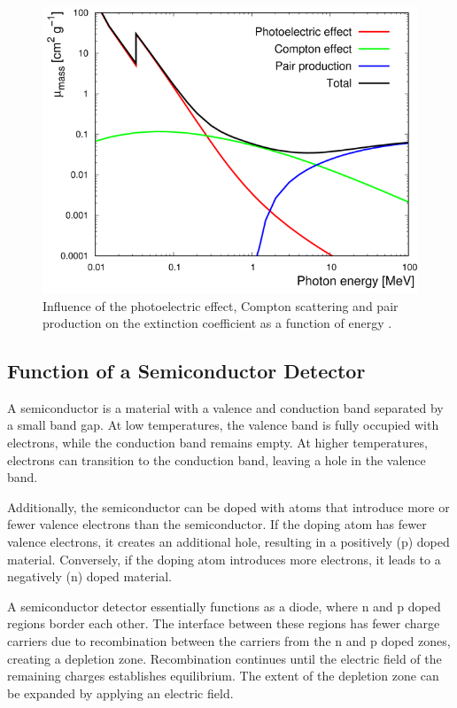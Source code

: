 \begin{figure}
    \centering
    \includegraphics[scale=0.5]{pictures/extinction.png}
    \caption{Influence of the photoelectric effect, Compton scattering 
    and pair production on the extinction coefficient as a function of 
    energy \cite{LNT}.}
    \label{fig:extinction}
\end{figure}

\subsection{Function of a Semiconductor Detector}
\noindent
A semiconductor is a material with a valence and conduction band 
separated by a small band gap. At low temperatures, the valence 
band is fully occupied with electrons, while the conduction band 
remains empty. At higher temperatures, electrons can transition to 
the conduction band, leaving a hole in the valence band.

\noindent
Additionally, the semiconductor can be doped with atoms that 
introduce more or fewer valence electrons than the semiconductor. 
If the doping atom has fewer valence electrons, it creates an 
additional hole, resulting in a positively (p) doped material. 
Conversely, if the doping atom introduces more electrons, it leads 
to a negatively (n) doped material.

\noindent
A semiconductor detector essentially functions as a diode, where n 
and p doped regions border each other. The interface between these 
regions has fewer charge carriers due to recombination between the 
carriers from the n and p doped zones, creating a depletion zone. 
Recombination continues until the electric field of the remaining 
charges establishes equilibrium. The extent of the depletion zone 
can be expanded by applying an electric field.

